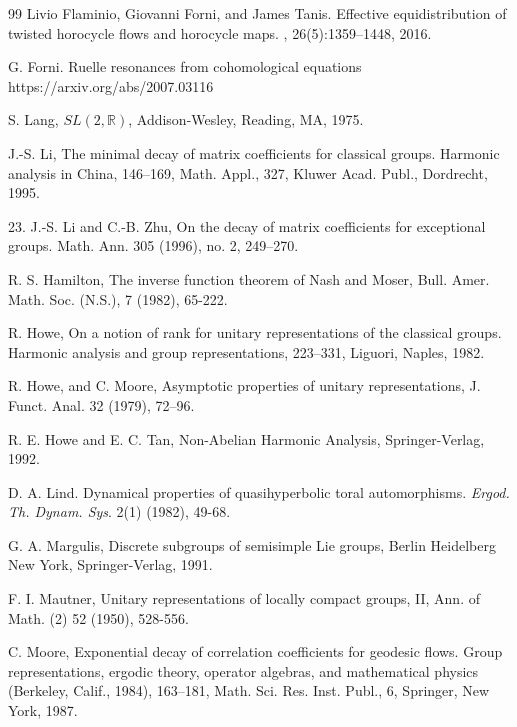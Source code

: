 \documentclass[11 pt]{amsart}
\newcommand{\RR}{\mathbb{R}}
\theoremstyle{definition}
\numberwithin{equation}{section}
\begin{document}
\begin{thebibliography}{99}
Livio Flaminio, Giovanni Forni, and James Tanis.
\newblock Effective equidistribution of twisted horocycle flows and horocycle
  maps.
, 26(5):1359--1448, 2016.

 G. Forni. Ruelle resonances from cohomological equations https://arxiv.org/abs/2007.03116




 S. Lang, $SL(2,\RR)$, Addison-Wesley, Reading, MA, 1975.

 J.-S. Li, The minimal decay of matrix coefficients for classical groups. Harmonic analysis in China, 146–169,
Math. Appl., 327, Kluwer Acad. Publ., Dordrecht, 1995.

 23. J.-S. Li and C.-B. Zhu, On the decay of matrix coefficients for exceptional groups. Math. Ann. 305 (1996),
no. 2, 249–270.

 R. S. Hamilton, The inverse function theorem of Nash and Moser, Bull. Amer. Math. Soc.
(N.S.), 7 (1982), 65-222.

 R. Howe, On a notion of rank for unitary representations of the classical groups. Harmonic analysis and
group representations, 223–331, Liguori, Naples, 1982.

 R. Howe, and C. Moore, Asymptotic properties of unitary representations, J. Funct. Anal. 32 (1979), 72–96.

 R. E. Howe and E. C. Tan, Non-Abelian Harmonic Analysis, Springer-Verlag, 1992.


 D. A. Lind. Dynamical properties of quasihyperbolic toral automorphisms. \emph{Ergod. Th.  Dynam. Sys}. 2(1)
(1982), 49-68.

 G. A. Margulis, Discrete subgroups of semisimple Lie groups, Berlin Heidelberg New York,
Springer-Verlag, 1991.

 F. I. Mautner, Unitary representations of locally compact groups, II, Ann. of Math. (2) 52
(1950), 528-556.


 C. Moore, Exponential decay of correlation coefficients for geodesic flows. Group representations, ergodic
theory, operator algebras, and mathematical physics (Berkeley, Calif., 1984), 163–181, Math. Sci. Res. Inst.
Publ., 6, Springer, New York, 1987.


\end{thebibliography}
\end{document}
